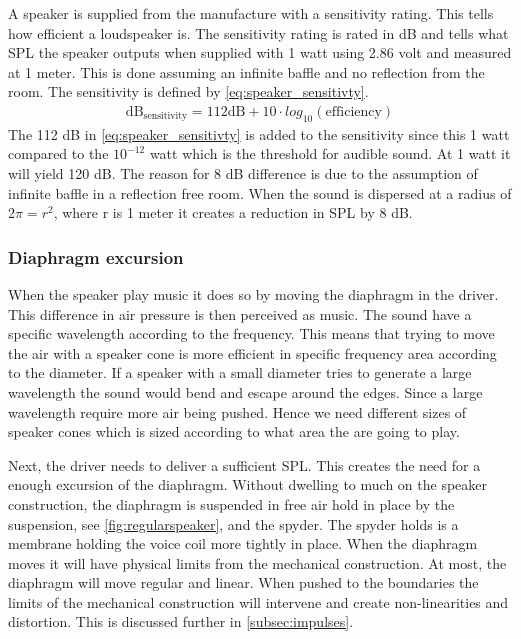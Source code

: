 A speaker is supplied from the manufacture with a sensitivity rating. This tells how efficient a loudspeaker is. The sensitivity rating is rated in dB and tells what \gls{SPL} the speaker outputs when supplied with 1 watt using 2.86 volt and measured at 1 meter. This is done assuming an infinite baffle and no reflection from the room. The sensitivity is defined by \autoref{eq:speaker_sensitivty}.
\begin{align}\label{eq:speaker_sensitivty}
\text{dB}_\text{sensitivity}=112\text {dB} +10 \cdot log_{10}(\text{efficiency})
\end{align}  
The 112 dB in \autoref{eq:speaker_sensitivty} is added to the sensitivity since this 1 watt compared to the $10^{-12}$ watt which is the threshold for audible sound. At 1 watt it will yield 120 dB. The reason for 8 dB difference is due to the assumption of infinite baffle in a reflection free room. When the sound is dispersed at a radius of $2\pi=r^2$, where r is 1 meter it creates a reduction in \gls{SPL} by 8 dB.

\subsubsection*{Diaphragm excursion}

When the speaker play music it does so by moving the diaphragm in the driver. This difference in air pressure is then perceived as music. The sound have a specific wavelength according to the frequency. This means that trying to move the air with a speaker cone is more efficient in specific frequency area according to the diameter. If a speaker with a small diameter tries to generate a large wavelength the sound would bend and escape around the edges. Since a large wavelength require more air being pushed. Hence we need different sizes of speaker cones which is sized according to what area the are going to play.

Next, the driver needs to deliver a sufficient \gls{SPL}. This creates the need for a enough excursion of the diaphragm. Without dwelling to much on the speaker construction, the diaphragm is suspended in free air hold in place by the suspension, see \autoref{fig:regularspeaker}, and the spyder. The spyder holds is a membrane holding the voice coil more tightly in place. When the diaphragm moves it will have physical limits from the mechanical construction. At most, the diaphragm will move regular and linear. When pushed to the boundaries the limits of the mechanical construction will intervene and create non-linearities and distortion. This is discussed further in \autoref{subsec:impulses}.


